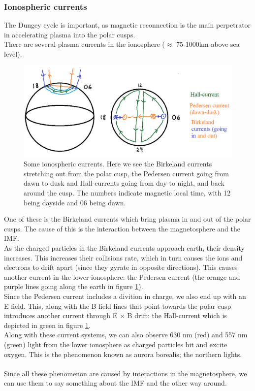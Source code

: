 \documentclass[norsk,a4paper,12pt]{article}
\begin{document}
	\subsubsection{Ionospheric currents}
	The Dungey cycle is important, as magnetic reconnection is the main perpetrator in accelerating plasma into the polar cusps.\\
	There are several plasma currents in the ionosphere ($\approx$ 75-1000km above sea level).
	\begin{figure}[H]
		\includegraphics[scale = 0.7]{Figures/ionosphere_currents.png}
		\centering
		\caption{Some ionospheric currents. Here we see the Birkeland currents stretching out from the polar cusp, the Pedersen current going from dawn to 						dusk and Hall-currents going from day to night, and back around the cusp. The numbers indicate magnetic local time, with 12 being dayside 			and 06 being dawn.}

		\label{fig::ionosphere}
	\end{figure}
	One of these is the Birkeland currents which bring plasma in and out of the polar cusps. The cause of this is the interaction between the magnetosphere and 	the IMF.\\
	As the charged particles in the Birkeland currents approach earth, their density increases. This increases their collisions rate, which in turn causes the ions 			and electrons to drift apart (since they gyrate in opposite directions). This causes another current in the lower ionosphere: the Pedersen current (the orange 	and purple lines 	going along the earth in figure \ref{fig::ionosphere}).\\
	Since the Pedersen current includes a divition in charge, we also end up with an E field. This, along with the B field lines that point towards the polar cusp 			introduces another current through E $\times$ B drift: the Hall-current which is depicted in green in figure \ref{fig::ionosphere}.\\
	Along with these current systems, we can also observe 630 nm (red) and 557 nm (green) light from the lower ionosphere as charged particles hit and 			excite oxygen. This is the phenomenon known as aurora borealis; the northern lights.\\
	\\
	Since all these phenomenon are caused by interactions in the magnetosphere, we can use them to say something about the IMF and the other way around. 
	
\end{document}
